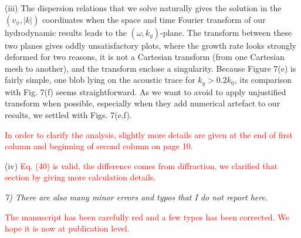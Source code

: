 \documentclass{article}
\def\tc{\textcolor{red}}
\begin{document}
(iii) The dispersion relations that we solve naturally gives the solution in  the $(v_\phi,\vert k \vert)$ coordinates when the space and time Fourier transform of  our hydrodynamic results  leads to the $(\omega,k_y)$-plane. The transform between these two planes gives oddly unsatisfactory plots, where the growth rate looks strongly deformed for two reasons, it is not a Cartesian transform (from one Cartesian mesh to another), and the transform enclose a singularity. Because Figure 7(e) is fairly simple, one blob lying on the acoustic trace for $k_y>0.2k_0$, its comparison with Fig. 7(f) seems straightforward.
As we want to avoid to apply  unjustified transform when possible, especially when they add numerical artefact to our results, we settled with Figs. 7(e,f).

\tc{In order to clarify the analysis, slightly more details are given at the end of first column and beginning of second column on  page 10.}

(iv) \tc{Eq. (40) is valid, the difference comes from diffraction, we clarified that section by giving more calculation details. } 

\textit{
7) There are also many minor errors and typos that I do not report here.
}

\tc{The manuscript has been carefully red and a few typos has been corrected. We hope it is now at publication level.  }
\end{document}
